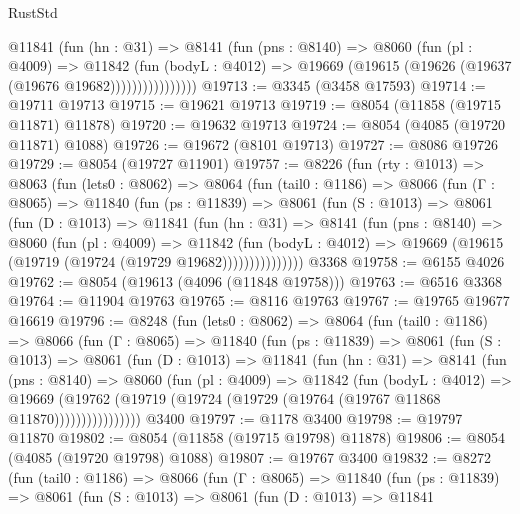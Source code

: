 \begin{lexlean}{RustStd}
\begin{coremodule}
                  @11841
                    (fun (hn : @31) =>
                    @8141
                      (fun (pns : @8140) =>
                      @8060
                        (fun (pl : @4009) =>
                        @11842
                          (fun (bodyL : @4012) =>
                          @19669 (@19615 (@19626 (@19637 (@19676 @19682))))))))))))))))
@19713 := @3345 (@3458 @17593)
@19714 := @19711 @19713
@19715 := @19621 @19713
@19719 := @8054 (@11858 (@19715 @11871) @11878)
@19720 := @19632 @19713
@19724 := @8054 (@4085 (@19720 @11871) @1088)
@19726 := @19672 (@8101 @19713)
@19727 := @8086 @19726
@19729 := @8054 (@19727 @11901)
@19757 := @8226
    (fun (rty : @1013) =>
    @8063
      (fun (lets0 : @8062) =>
      @8064
        (fun (tail0 : @1186) =>
        @8066
          (fun (Γ : @8065) =>
          @11840
            (fun (ps : @11839) =>
            @8061
              (fun (S : @1013) =>
              @8061
                (fun (D : @1013) =>
                @11841
                  (fun (hn : @31) =>
                  @8141
                    (fun (pns : @8140) =>
                    @8060
                      (fun (pl : @4009) =>
                      @11842
                        (fun (bodyL : @4012) =>
                        @19669 (@19615 (@19719 (@19724 (@19729 @19682)))))))))))))))
    @3368
@19758 := @6155 @4026
@19762 := @8054 (@19613 (@4096 (@11848 @19758)))
@19763 := @6516 @3368
@19764 := @11904 @19763
@19765 := @8116 @19763
@19767 := @19765 @19677 @16619
@19796 := @8248
    (fun (lets0 : @8062) =>
    @8064
      (fun (tail0 : @1186) =>
      @8066
        (fun (Γ : @8065) =>
        @11840
          (fun (ps : @11839) =>
          @8061
            (fun (S : @1013) =>
            @8061
              (fun (D : @1013) =>
              @11841
                (fun (hn : @31) =>
                @8141
                  (fun (pns : @8140) =>
                  @8060
                    (fun (pl : @4009) =>
                    @11842
                      (fun (bodyL : @4012) =>
                      @19669
                        (@19762
                          (@19719 (@19724 (@19729 (@19764 (@19767 @11868 @11870))))))))))))))))
    @3400
@19797 := @1178 @3400
@19798 := @19797 @11870
@19802 := @8054 (@11858 (@19715 @19798) @11878)
@19806 := @8054 (@4085 (@19720 @19798) @1088)
@19807 := @19767 @3400
@19832 := @8272
    (fun (tail0 : @1186) =>
    @8066
      (fun (Γ : @8065) =>
      @11840
        (fun (ps : @11839) =>
        @8061
          (fun (S : @1013) =>
          @8061
            (fun (D : @1013) =>
            @11841

\end{coremodule}
\end{lexlean}
